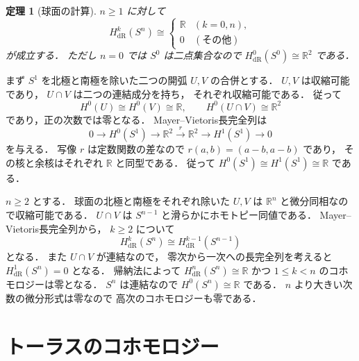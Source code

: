 \documentclass[a5paper,10pt,onecolumn]{jsarticle}
\makeatletter
\theoremstyle{mathnotetheorem}
\newtheorem{theorem}{定理}[section]
\renewcommand{\proofname}{証明}
\renewenvironment{proof}[1][\proofname]{%
  \par\pushQED{\qed}\normalfont\topsep4\p@\@plus2\p@\relax
  \trivlist\item[\hskip\labelsep\bfseries #1]\ignorespaces
}{\popQED\endtrivlist\@endpefalse}
\makeatother
\begin{document}
\begin{theorem}[球面の計算]\label{thm:sphere}
$n\ge1$ に対して
\[
 H_{\mathrm{dR}}^k(S^n)\cong
 \begin{cases}
 \mathbb R&(k=0,n),\\
 0&(\text{その他})
 \end{cases}
\]
が成立する．
ただし $n=0$ では $S^0$ は二点集合なので
$H_{\mathrm{dR}}^0(S^0)\cong\mathbb R^2$ である．
\end{theorem}
\begin{proof}
まず $S^1$ を北極と南極を除いた二つの開弧
$U,V$ の合併とする．
$U,V$ は収縮可能であり，
$U\cap V$ は二つの連結成分を持ち，
それぞれ収縮可能である．
従って
\[
 H^0(U)\cong H^0(V)\cong\mathbb R,\qquad
 H^0(U\cap V)\cong\mathbb R^2
\]
であり，正の次数では零となる．
Mayer--Vietoris長完全列は
\[
 0\to H^0(S^1)\to\mathbb R^2
 \xrightarrow{r}\mathbb R^2
 \to H^1(S^1)\to0
\]
を与える．
写像 $r$ は定数関数の差なので
$r(a,b)=(a-b,a-b)$ であり，
その核と余核はそれぞれ $\mathbb R$ と同型である．
従って $H^0(S^1)\cong H^1(S^1)\cong\mathbb R$ である．

$n\ge2$ とする．
球面の北極と南極をそれぞれ除いた
$U,V$ は $\mathbb R^n$ と微分同相なので収縮可能である．
$U\cap V$ は $S^{n-1}$ と滑らかにホモトピー同値である．
Mayer--Vietoris長完全列から，
$k\ge2$ について
\[
 H_{\mathrm{dR}}^k(S^n)
 \cong H_{\mathrm{dR}}^{k-1}(S^{n-1})
\]
となる．
また $U\cap V$ が連結なので，
零次から一次への長完全列を考えると
$H_{\mathrm{dR}}^1(S^n)=0$ となる．
帰納法によって $H_{\mathrm{dR}}^n(S^n)\cong\mathbb R$
かつ $1\le k<n$ のコホモロジーは零となる．
$S^n$ は連結なので $H^0(S^n)\cong\mathbb R$ である．
$n$ より大きい次数の微分形式は零なので
高次のコホモロジーも零である．
\end{proof}

\section{トーラスのコホモロジー}
\end{document}
